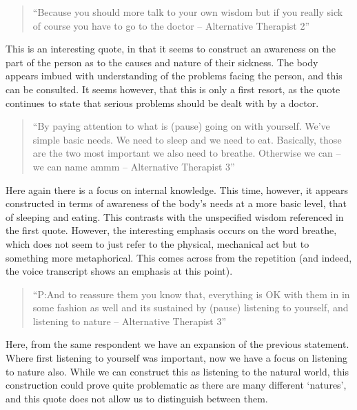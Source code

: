 \begin{quotation}
``Because you should more talk to your own wisdom but if you really sick of course you have to go to the doctor – Alternative Therapist 2''  
\end{quotation}


This is an interesting quote, in that it seems to construct an awareness on the part of the person as to the causes and nature of their sickness. The body appears imbued with understanding of the problems facing the person, and this can be consulted. It seems however, that this is only a first resort, as the quote continues to state that serious problems should be dealt with by a doctor.

\begin{quotation}
``By paying attention to what is (pause) going on with yourself. We've simple basic needs. We need to sleep and we need to eat. Basically, those are the two most important we also need to breathe. Otherwise we can – we can name ammm – Alternative Therapist 3''  
\end{quotation}


Here again there is a focus on internal knowledge. This time, however, it appears constructed in terms of awareness of the body's needs at a more basic level, that of sleeping and eating. This contrasts with the unspecified wisdom referenced in the first quote. However, the interesting emphasis occurs on the word breathe, which does not seem to just refer to the physical, mechanical act but to something more metaphorical. This comes across from the repetition (and indeed, the voice transcript shows an emphasis at this point).  


\begin{quotation}
``P:And to reassure them you know that, everything is OK with them in in some fashion as well and its sustained by (pause) listening to yourself, and listening to nature – Alternative Therapist 3''  
\end{quotation}


Here, from the same respondent we have an expansion of the previous statement. Where first listening to yourself was important, now we have a focus on listening to nature also. While we can construct this as listening to the natural world, this construction could prove quite problematic as there are many different `natures', and this quote does not allow us to distinguish between them. 


